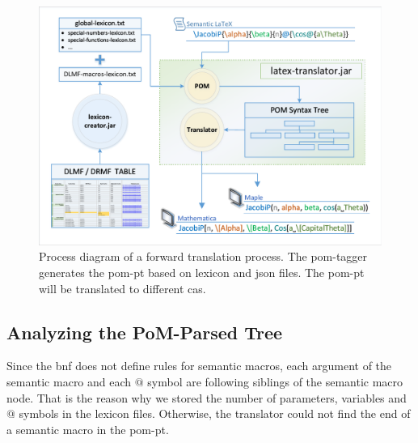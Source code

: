 \documentclass[a4paper,11pt]{article}
\theoremstyle{defTheoStyle}
\theoremstyle{defExampStyle}
\begin{document}
	\begin{figure}[ht]
		\vspace{-10pt}
		\centering
		\includegraphics[clip, trim=0.2cm 0.2cm 0.2cm 0.2cm, scale=0.72]{ForwardTranslationProcess.pdf}
		\caption{Process diagram of a forward translation process. The \gls*{pom}-tagger generates the \gls*{pom-pt} based on lexicon and \gls*{json} files. The \gls*{pom-pt} will be translated to different \gls*{cas}.}
		\label{fig:forward-trans}
		\vspace{-10pt}
	\end{figure}
	
	\subsection{Analyzing the PoM-Parsed Tree}\label{subsec:analyze-mlp}
	Since the \gls*{bnf} does not define rules for semantic macros, each argument of the semantic macro and each $@$ symbol are following siblings of the semantic macro node. That is the reason why we stored the number of parameters, variables and $@$ symbols in the lexicon files. Otherwise, the translator could not find the end of a semantic macro in the \gls*{pom-pt}.
	
\end{document}
